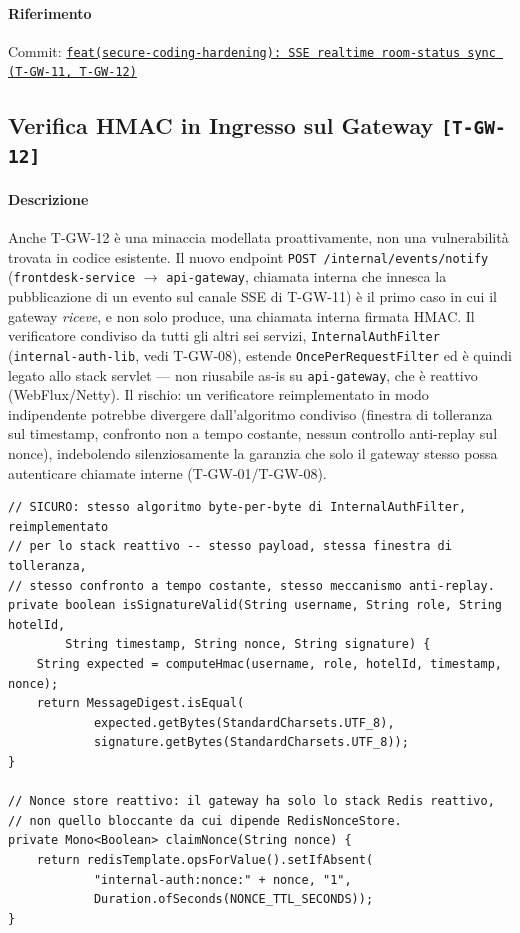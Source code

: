 ﻿\documentclass[a4paper,12pt]{report}
\newcommand{\commitref}[2]{\texttt{\small \href{https://github.com/diegoandruccioli/hotel-pms/commit/#1}{#2}}}
\newcommand{\threat}[1]{\texttt{\small\textcolor{vulnred}{[#1]}}}
\begin{document}
\paragraph{Riferimento} Commit: \commitref{a2620fc}{feat(secure-coding-hardening): SSE realtime room-status sync (T-GW-11, T-GW-12)}


\subsection{Verifica HMAC in Ingresso sul Gateway \threat{T-GW-12}}

\paragraph{Descrizione}
Anche T-GW-12 è una minaccia modellata proattivamente, non una vulnerabilità
trovata in codice esistente. Il nuovo endpoint \texttt{POST /internal/events/notify}
(\texttt{frontdesk-service} $\to$ \texttt{api-gateway}, chiamata interna che
innesca la pubblicazione di un evento sul canale SSE di T-GW-11) è il primo
caso in cui il gateway \emph{riceve}, e non solo produce, una chiamata interna
firmata HMAC. Il verificatore condiviso da tutti gli altri sei servizi,
\texttt{InternalAuthFilter} (\texttt{internal-auth-lib}, vedi T-GW-08), estende
\texttt{OncePerRequestFilter} ed è quindi legato allo stack servlet --- non
riusabile as-is su \texttt{api-gateway}, che è reattivo (WebFlux/Netty). Il
rischio: un verificatore reimplementato in modo indipendente potrebbe
divergere dall'algoritmo condiviso (finestra di tolleranza sul timestamp,
confronto non a tempo costante, nessun controllo anti-replay sul nonce),
indebolendo silenziosamente la garanzia che solo il gateway stesso possa
autenticare chiamate interne (T-GW-01/T-GW-08).

\begin{securebox}[title={Codice Sicuro --- InternalEventsAuthFilter.java}]
\begin{lstlisting}[style=java]
// SICURO: stesso algoritmo byte-per-byte di InternalAuthFilter, reimplementato
// per lo stack reattivo -- stesso payload, stessa finestra di tolleranza,
// stesso confronto a tempo costante, stesso meccanismo anti-replay.
private boolean isSignatureValid(String username, String role, String hotelId,
        String timestamp, String nonce, String signature) {
    String expected = computeHmac(username, role, hotelId, timestamp, nonce);
    return MessageDigest.isEqual(
            expected.getBytes(StandardCharsets.UTF_8),
            signature.getBytes(StandardCharsets.UTF_8));
}

// Nonce store reattivo: il gateway ha solo lo stack Redis reattivo,
// non quello bloccante da cui dipende RedisNonceStore.
private Mono<Boolean> claimNonce(String nonce) {
    return redisTemplate.opsForValue().setIfAbsent(
            "internal-auth:nonce:" + nonce, "1",
            Duration.ofSeconds(NONCE_TTL_SECONDS));
}
\end{lstlisting}
\end{securebox}
\end{document}
